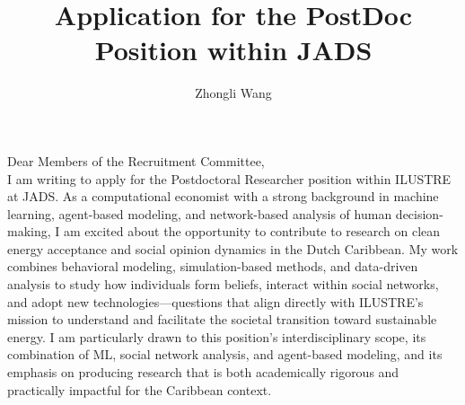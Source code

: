 \documentclass{nfr}
\title{Application for the PostDoc Position within JADS}
\author{Zhongli Wang}
\begin{document}

% 
% 
% 
% 


\maketitle


\noindent Dear Members of the Recruitment Committee,\\[0.2cm]

I am writing to apply for the Postdoctoral Researcher position within ILUSTRE at JADS. 
As a computational economist with a strong background in machine learning, agent-based modeling, and network-based analysis of human decision-making, 
I am excited about the opportunity to contribute to research on clean energy acceptance and social opinion dynamics in the Dutch Caribbean. 
My work combines behavioral modeling, simulation-based methods, and data-driven analysis to study how individuals form beliefs, interact within social networks, and adopt new technologies—questions that align directly with ILUSTRE’s mission to understand and facilitate the societal transition toward sustainable energy. 
I am particularly drawn to this position’s interdisciplinary scope, its combination of ML, social network analysis, and agent-based modeling, and its emphasis on producing research that is both academically rigorous and practically impactful for the Caribbean context.\\
\end{document}
